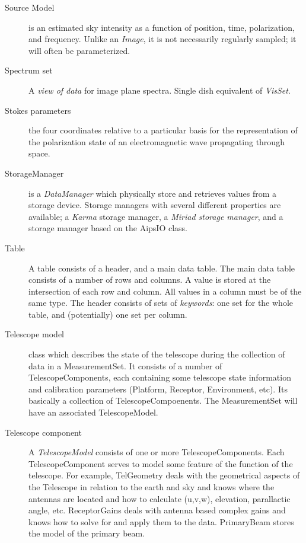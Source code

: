 \begin{description}
\item[Source Model] is an estimated sky intensity as a function of
position, time, polarization, and frequency. Unlike an {\em Image}, it
is not necessarily regularly sampled; it will often be parameterized.


\item[Spectrum set]
A {\em view of data} for image plane spectra. Single dish equivalent
of {\em VisSet}.


\item[Stokes parameters]
the four coordinates relative to a particular basis
for the representation of the polarization state
of an electromagnetic wave propagating through space.


\item[StorageManager]
is a {\em DataManager} which physically store and retrieves values from
a storage device. Storage managers with several different properties
are available; a {\em Karma} storage manager, a {\em Miriad storage
manager}, and a storage manager based on the AipsIO class.

\item[Table]
A table consists of a header, and a main data table. The main data
table consists of a number of rows and columns. A value is stored at
the intersection of each row and column. All values in a column must
be of the same type. The header consists of sets of {\em keywords}:
one set for the whole table, and (potentially) one set per column.



\item[Telescope model]
class which describes the state of the telescope during the collection
of data in a MeasurementSet.  It consists of a number of
TelescopeComponents, each containing some telescope state information
and calibration parameters (Platform, Receptor, Environment, etc).
Its basically a collection of TelescopeCompoenents.  The
MeasurementSet will have an associated TelescopeModel.

\item[Telescope component]
A {\em TelescopeModel} consists of one or more
TelescopeComponents. Each TelescopeComponent serves to model some
feature of the function of the telescope.  For example, TelGeometry
deals with the geometrical aspects of the Telescope in relation to the
earth and sky and knows where the antennas are located and how to
calculate (u,v,w), elevation, parallactic angle, etc. ReceptorGains
deals with antenna based complex gains and knows how to solve for and
apply them to the data.  PrimaryBeam stores the model of the primary
beam.



\end{description}
